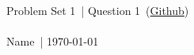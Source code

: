 \documentclass{article}
\begin{document}
    \def\problemSet{1}
    \def\question{1}
    \def\name{Name}

    \begin{center}
        \large{Problem Set \problemSet\ | Question \question\ (\href{https://github.com/zhaoshenzhai/CatTheory-F23}{Github})}\\\ \\
        \normalsize{\name\ | \today}
    \end{center}

    \setcounter{exercise}{\question-1}

    \begin{exercise}
        
    \end{exercise}
    \begin{solution}
        
    \end{solution}
\end{document}
